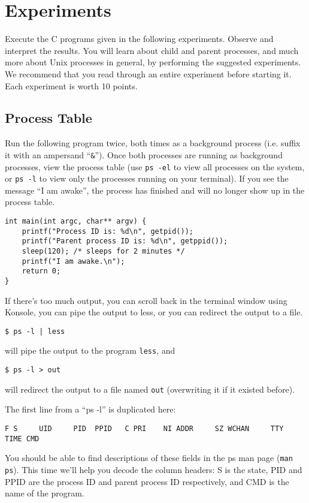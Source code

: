 \documentclass[letterpaper,10pt]{article}
\newcommand{\cmd}[1]{\texttt{#1}}
\begin{document}
\section{Experiments}
Execute the C programs given in the following experiments. Observe and interpret the results.
You will learn about child and parent processes, and much more about Unix processes in
general, by performing the suggested experiments. We recommend that you read through an
entire experiment before starting it. Each experiment is worth 10 points.

\subsection{Process Table}
Run the following program twice, both times as a background process (i.e. suffix it with an
ampersand ``\cmd{\&}''). Once both processes are running as background processes, view the process
table (use \cmd{ps -el} to view all processes on the system, or \cmd{ps -l} to view only the processes
running on your terminal). If you see the message ``I am awake'', the process has finished and
will no longer show up in the process table.

\begin{verbatim}
int main(int argc, char** argv) {
    printf("Process ID is: %d\n", getpid());
    printf("Parent process ID is: %d\n", getppid());
    sleep(120); /* sleeps for 2 minutes */
    printf("I am awake.\n");
    return 0;
}
\end{verbatim}
If there's too much output, you can scroll back in the terminal window using Konsole, you can
pipe the output to less, or you can redirect the output to a file.
\begin{verbatim}
$ ps -l | less
\end{verbatim}
will pipe the output to the program \cmd{less}, and
\begin{verbatim}
$ ps -l > out
\end{verbatim}
will redirect the output to a file named \cmd{out} (overwriting it if it existed before).

The first line from a ``ps -l'' is duplicated here:
\begin{verbatim}
F S     UID     PID  PPID   C PRI    NI ADDR     SZ WCHAN     TTY             TIME CMD
\end{verbatim}
You should be able to find descriptions of these fields in the ps man page (\cmd{man ps}). This time
we'll help you decode the column headers: S is the state, PID and PPID are the process ID and
parent process ID respectively, and CMD is the name of the program.
\end{document}
